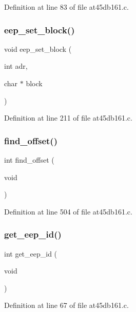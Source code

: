 Definition at line 83 of file at45db161.\+c.

\mbox{\label{at45db161_8h_ad2bdb37e9ffea7236eeef049359d3214}} 
\subsubsection{eep\+\_\+set\+\_\+block()}
{\footnotesize\ttfamily void eep\+\_\+set\+\_\+block (\begin{DoxyParamCaption}\item[{int}]{adr,  }\item[{char $\ast$}]{block }\end{DoxyParamCaption})}



Definition at line 211 of file at45db161.\+c.

\mbox{\label{at45db161_8h_ae31a6837673e8e8ee1012f92c4c77a58}} 
\subsubsection{find\+\_\+offset()}
{\footnotesize\ttfamily int find\+\_\+offset (\begin{DoxyParamCaption}\item[{void}]{ }\end{DoxyParamCaption})}



Definition at line 504 of file at45db161.\+c.

\mbox{\label{at45db161_8h_a37e2d1e5c9cee1f787749317d8921d74}} 
\subsubsection{get\+\_\+eep\+\_\+id()}
{\footnotesize\ttfamily int get\+\_\+eep\+\_\+id (\begin{DoxyParamCaption}\item[{void}]{ }\end{DoxyParamCaption})}



Definition at line 67 of file at45db161.\+c.

